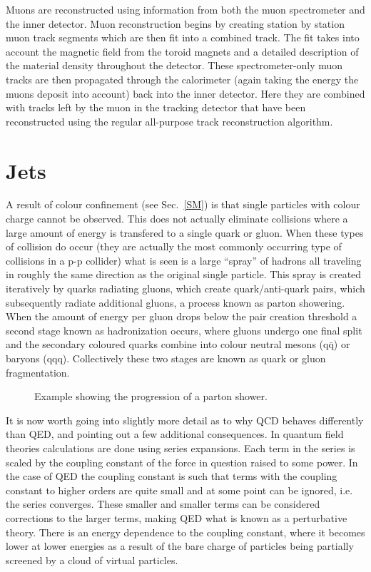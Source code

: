 Muons are reconstructed using information from both the muon spectrometer and the inner detector.  
Muon reconstruction begins by creating station by station muon track segments which are then fit into a combined track.  
The fit takes into account the magnetic field from the toroid magnets and a detailed description of the material density throughout the detector.  
These spectrometer-only muon tracks are then propagated through the calorimeter (again taking the energy the muons deposit into account) back into the inner detector.  
Here they are combined with tracks left by the muon in the tracking detector that have been reconstructed using the regular all-purpose track reconstruction algorithm.  

\section{Jets}
\label{jets}

A result of colour confinement (see Sec.~\ref{SM}) is that single particles with colour charge cannot be observed.  
This does not actually eliminate collisions where a large amount of energy is transfered to a single quark or gluon.  
When these types of collision do occur (they are actually the most commonly occurring type of collisions in a p-p collider) what is seen is a large ``spray'' of hadrons all traveling in roughly the same direction as the original single particle.  
This spray is created iteratively by quarks radiating gluons, which create quark/anti-quark pairs, which subsequently radiate additional gluons, a process known as parton showering.  
When the amount of energy per gluon drops below the pair creation threshold a second stage known as hadronization occurs, where gluons undergo one final split and the secondary coloured quarks combine into colour neutral mesons (q$\bar{\mathrm q}$) or baryons (qqq).    
Collectively these two stages are known as quark or gluon fragmentation.  

\begin{figure}[!ht]
  \begin{center}
  \end{center}
  \caption[Parton showering diagram]
  {\small Example showing the progression of a parton shower.  }
\end{figure}

It is now worth going into slightly more detail as to why QCD behaves differently than QED, and pointing out a few additional consequences.  
In quantum field theories calculations are done using series expansions.  
Each term in the series is scaled by the coupling constant of the force in question raised to some power.  
In the case of QED the coupling constant is such that terms with the coupling constant to higher orders are quite small and at some point can be ignored, i.e. the series converges.  
These smaller and smaller terms can be considered corrections to the larger terms, making QED what is known as a perturbative theory.  
There is an energy dependence to the coupling constant, where it becomes lower at lower energies as a result of the bare charge of particles being partially screened by a cloud of virtual particles.  

